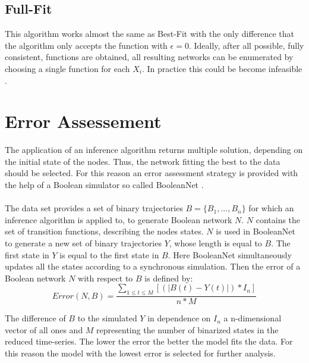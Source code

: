 \subsection*{Full-Fit}
This algorithm works almost the same as Best-Fit with the only difference that the algorithm only accepts the function with $\epsilon = 0$. Ideally, after all possible, fully consistent, functions are obtained, all resulting networks can be enumerated by choosing a single function for each $X_{i}$. In practice this could be become infeasible \citep{Battiti.1994}.


\section{Error Assessement}
The application of an inference algorithm returns multiple solution, depending on the initial state of the nodes. Thus, the network fitting the best to the data should be selected. For this reason an error assessment strategy is provided with the help of a Boolean simulator so called BooleanNet \citep{Albert.2008}.\\\\

The data set provides a set of binary trajectories $B=\{B_{1},...,B_{n}\}$ for which an inference algorithm is applied to, to generate Boolean network $N$. $N$ contains the set of transition functions, describing the nodes states. $N$ is used in BooleanNet to generate a new set of binary trajectories $Y$, whose length is equal to $B$. The first state in $Y$ is equal to the first state in $B$. Here BooleanNet simultaneously updates all the states according to a synchronous simulation. Then the error of a Boolean network $N$ with respect to $B$ is defined by:
\begin{equation}
Error(N,B)=\frac{\sum_{1\le t\le M} [(|B(t)-Y(t)|)*I_{n}]}{n*M}
\end{equation}

\newpage

The difference of $B$ to the simulated $Y$ in dependence on $I_{n}$ a n-dimensional vector of all ones and $M$ representing the number of binarized states in the reduced time-series. The lower the error the better the model fits the data. For this reason the model with the lowest error is selected for further analysis.


